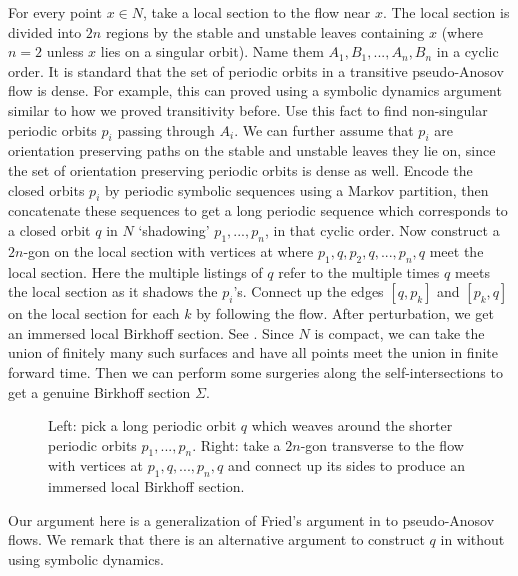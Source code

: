 \documentclass[12pt]{amsart}
\theoremstyle{definition}
\numberwithin{equation}{section}
\begin{document}
For every point $x \in N$, take a local section to the flow near $x$. The local section is divided into $2n$ regions by the stable and unstable leaves containing $x$ (where $n=2$ unless $x$ lies on a singular orbit). Name them $A_1,B_1,...,A_n,B_n$ in a cyclic order. It is standard that the set of periodic orbits in a transitive pseudo-Anosov flow is dense. For example, this can proved using a symbolic dynamics argument similar to how we proved transitivity before. Use this fact to find non-singular periodic orbits $p_i$ passing through $A_i$. We can further assume that $p_i$ are orientation preserving paths on the stable and unstable leaves they lie on, since the set of orientation preserving periodic orbits is dense as well. Encode the closed orbits $p_i$ by periodic symbolic sequences using a Markov partition, then concatenate these sequences to get a long periodic sequence which corresponds to a closed orbit $q$ in $N$ `shadowing' $p_1,...,p_n$, in that cyclic order. Now construct a $2n$-gon on the local section with vertices at where $p_1,q,p_2,q,...,p_n,q$ meet the local section. Here the multiple listings of $q$ refer to the multiple times $q$ meets the local section as it shadows the $p_i$'s. Connect up the edges $[q,p_k]$ and $[p_k,q]$ on the local section for each $k$ by following the flow. After perturbation, we get an immersed local Birkhoff section. See . Since $N$ is compact, we can take the union of finitely many such surfaces and have all points meet the union in finite forward time. Then we can perform some surgeries along the self-intersections to get a genuine Birkhoff section $\Sigma$. 

\begin{figure}
    \centering
    \fontsize{12pt}{12pt}\selectfont
    \resizebox{!}{8cm}{}
    \caption{Left: pick a long periodic orbit $q$ which weaves around the shorter periodic orbits $p_1,...,p_n$. Right: take a $2n$-gon transverse to the flow with vertices at $p_1,q,...,p_n,q$ and connect up its sides to produce an immersed local Birkhoff section.}
    \label{fig:birkhoffsection}
\end{figure}

Our argument here is a generalization of Fried's argument in \cite{Fri83} to pseudo-Anosov flows. We remark that there is an alternative argument to construct $q$ in \cite{Bru95} without using symbolic dynamics.
\end{document}
